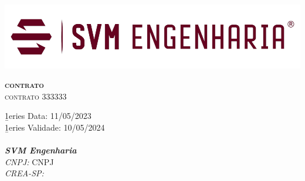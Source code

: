 
\begin{titlepage}

\begin{center}
\includegraphics[width=1\textwidth]{000-SVM_Logo_Trademark}\\[2cm]
\vbox{ }
\vbox{ }

\color{Sepia}
\textsc{\huge \textbf{contrato}}\\[2.5cm]
\textsc{\LARGE contrato 333333}\\[2.5cm]
\vbox{ }

\color{Gray}

{ \Large \b1eries Data: 11/05/2023}\\[0.25cm]
{ \large \b1eries Validade: 10/05/2024}\\[3.5cm]
\HRule \\[0.05cm]

\textbf{\emph{SVM Engenharia}}\\
\emph{CNPJ:}
CNPJ\\
\emph{CREA-SP:}

\vfill

\end{center}
\end{titlepage}
